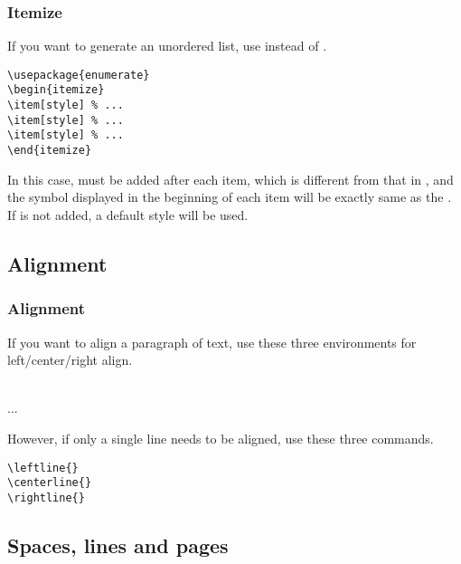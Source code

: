 \begin{frame}[fragile]
	\frametitle{Itemize}
	If you want to generate an unordered list, use  instead of .
	\begin{command}
		\begin{verbatim}
\usepackage{enumerate}
\begin{itemize}
\item[style] % ...
\item[style] % ...
\item[style] % ...
\end{itemize}
		\end{verbatim}
	\end{command}
	In this case,  must be added after each item, which is different from that in , and the symbol displayed in the beginning of each item will be exactly same as the . If  is not added, a default style will be used.
\end{frame}

\subsection{Alignment}

\begin{frame}[fragile]
	\frametitle{Alignment}
	If you want to align a paragraph of text, use these three environments for left/center/right align.
	\begin{command}
		\\
		\qquad ...\\
	\end{command}
	However, if only a single line needs to be aligned, use these three commands.
	\begin{command}
		\begin{verbatim}
\leftline{}
\centerline{}
\rightline{}
		\end{verbatim}
	\end{command}
\end{frame}

\subsection{Spaces, lines and pages}

